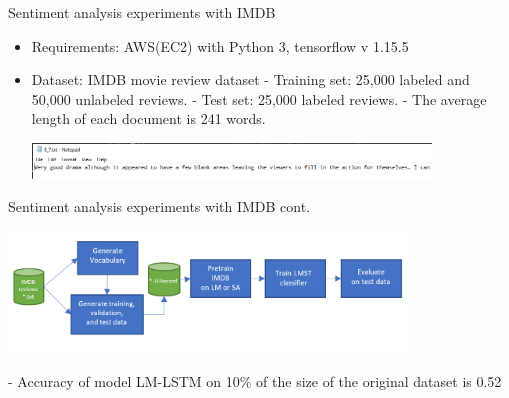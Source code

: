 \documentclass[aspectratio=169,xcolor=dvipsnames]{beamer}
\begin{document}
\begin{frame}{Sentiment analysis experiments with IMDB}
    \begin{itemize}
        \item Requirements: AWS(EC2) with Python 3, tensorflow v 1.15.5
        \item Dataset: IMDB movie review dataset\break 
            - Training set: 25,000 labeled and 50,000 unlabeled reviews.\break 
            - Test set: 25,000 labeled reviews.\break
            - The average length of each document is 241 words. 
        \newline
        \newline
         \begin{figure2}
            \includegraphics[width=400]{positive labblled review.PNG}
        \end{figure2}
    \end{itemize}
\end{frame}






\begin{frame}{Sentiment analysis experiments with IMDB cont.}
    \begin{itemize}
         \begin{figure2}
            \includegraphics[width=400]{replicationFlow2.PNG}
        \end{figure2}
        \newline
        \newline
        - Accuracy of model LM-LSTM on 10\% of the size of the original dataset is  0.52 \break
    \end{itemize}
\end{frame}
\end{document}
